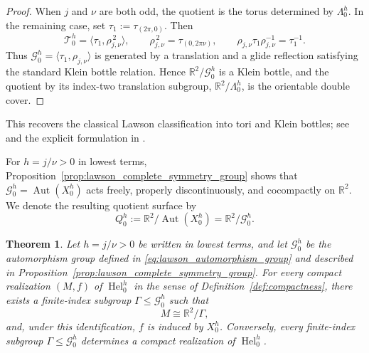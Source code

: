 \documentclass[a4paper,11pt]{amsart}
\numberwithin{equation}{section}
\theoremstyle{plain}
\newtheorem{thm}{Theorem}[section]
\begin{document}
\begin{proof}
When $j$ and $\nu$ are both odd, the quotient is the torus determined
by $\Lambda_0^h$. In the remaining case, set
$\tau_1:=\tau_{(2\pi,0)}$. Then
\[
\mathcal T_0^h
=
\langle \tau_1,\rho_{j,\nu}^{\,2}\rangle,
\qquad
\rho_{j,\nu}^{\,2}=\tau_{(0,2\pi\nu)},
\qquad
\rho_{j,\nu}\tau_1\rho_{j,\nu}^{-1}=\tau_1^{-1}.
\]
Thus $\mathcal G_0^h=\langle \tau_1,\rho_{j,\nu}\rangle$ is generated
by a translation and a glide reflection satisfying the standard Klein bottle
relation. Hence
$\mathbb R^2/\mathcal G_0^h$ is a Klein bottle, and the quotient by its index-two translation subgroup,
$\mathbb R^2/\Lambda_0^h$, is the orientable double cover.
\end{proof}

This recovers the classical Lawson classification into tori and Klein
bottles; see \cite[Section~7]{Lawson1970} and the explicit formulation in
\cite[Definition~2]{Penskoi2012}.

For $h=j/\nu>0$ in lowest terms, Proposition~\ref{prop:lawson_complete_symmetry_group}
shows that $\mathcal G_0^h=\operatorname{Aut}(X_0^h)$ acts freely,
properly discontinuously, and cocompactly on $\mathbb R^2$. We denote the
resulting quotient surface by
\begin{equation}\label{eq:lawson_automorphism_quotient}
Q_0^h
:=
\mathbb R^2/\operatorname{Aut}(X_0^h)
=
\mathbb R^2/\mathcal G_0^h.
\end{equation}
\begin{thm}
\label{thm:lawson_compact_realization_classification}
Let $h=j/\nu>0$ be written in lowest terms, and let
$\mathcal G_0^h$ be the automorphism group defined in
\eqref{eq:lawson_automorphism_group} and described in
Proposition~\ref{prop:lawson_complete_symmetry_group}. For every compact
realization $(M,f)$ of $\operatorname{Hel}_0^h$ in the sense of
Definition~\ref{def:compactness}, there exists a finite-index subgroup
$\Gamma\leq\mathcal G_0^h$ such that
\[
M\cong\mathbb R^2/\Gamma,
\]
and, under this identification, $f$ is induced by $X_0^h$.
Conversely, every finite-index subgroup
$\Gamma\leq\mathcal G_0^h$ determines a compact realization of
$\operatorname{Hel}_0^h$.
\end{thm}
\end{document}
